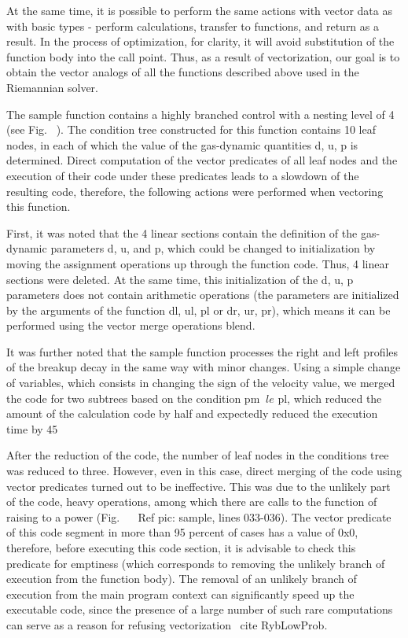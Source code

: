 \documentclass[
11pt,%
tightenlines,%
twoside,%
onecolumn,%
nofloats,%
nobibnotes,%
nofootinbib,%
superscriptaddress,%
noshowpacs,%
centertags]%
{revtex4}
\begin{document}
At the same time, it is possible to perform the same actions with vector data as with basic types - perform calculations, transfer to functions, and return as a result. In the process of optimization, for clarity, it will avoid substitution of the function body into the call point. Thus, as a result of vectorization, our goal is to obtain the vector analogs of all the functions described above used in the Riemannian solver.

The sample function contains a highly branched control with a nesting level of 4 (see Fig. ~). The condition tree constructed for this function contains 10 leaf nodes, in each of which the value of the gas-dynamic quantities d, u, p is determined. Direct computation of the vector predicates of all leaf nodes and the execution of their code under these predicates leads to a slowdown of the resulting code, therefore, the following actions were performed when vectoring this function.

First, it was noted that the 4 linear sections contain the definition of the gas-dynamic parameters d, u, and p, which could be changed to initialization by moving the assignment operations up through the function code. Thus, 4 linear sections were deleted. At the same time, this initialization of the d, u, p parameters does not contain arithmetic operations (the parameters are initialized by the arguments of the function dl, ul, pl or dr, ur, pr), which means it can be performed using the vector merge operations blend.

It was further noted that the sample function processes the right and left profiles of the breakup decay in the same way with minor changes. Using a simple change of variables, which consists in changing the sign of the velocity value, we merged the code for two subtrees based on the condition pm $ \ le $ pl, which reduced the amount of the calculation code by half and expectedly reduced the execution time by 45%

After the reduction of the code, the number of leaf nodes in the conditions tree was reduced to three. However, even in this case, direct merging of the code using vector predicates turned out to be ineffective. This was due to the unlikely part of the code, heavy operations, among which there are calls to the function of raising to a power (Fig. ~ \ Ref {pic: sample}, lines 033-036). The vector predicate of this code segment in more than 95 percent of cases has a value of 0x0, therefore, before executing this code section, it is advisable to check this predicate for emptiness (which corresponds to removing the unlikely branch of execution from the function body). The removal of an unlikely branch of execution from the main program context can significantly speed up the executable code, since the presence of a large number of such rare computations can serve as a reason for refusing vectorization \ cite {RybLowProb}.
\end{document}
